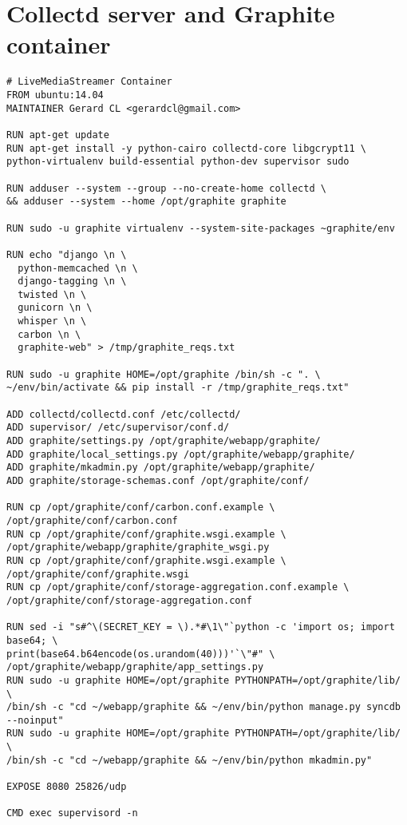 \section{Collectd server and Graphite container}\label{ANX:dockerFiles6}


\begin{verbatim}
# LiveMediaStreamer Container
FROM ubuntu:14.04
MAINTAINER Gerard CL <gerardcl@gmail.com>

RUN apt-get update
RUN apt-get install -y python-cairo collectd-core libgcrypt11 \
python-virtualenv build-essential python-dev supervisor sudo

RUN adduser --system --group --no-create-home collectd \
&& adduser --system --home /opt/graphite graphite

RUN sudo -u graphite virtualenv --system-site-packages ~graphite/env

RUN echo "django \n \
  python-memcached \n \
  django-tagging \n \
  twisted \n \
  gunicorn \n \
  whisper \n \
  carbon \n \
  graphite-web" > /tmp/graphite_reqs.txt

RUN sudo -u graphite HOME=/opt/graphite /bin/sh -c ". \
~/env/bin/activate && pip install -r /tmp/graphite_reqs.txt"

ADD collectd/collectd.conf /etc/collectd/
ADD supervisor/ /etc/supervisor/conf.d/
ADD graphite/settings.py /opt/graphite/webapp/graphite/
ADD graphite/local_settings.py /opt/graphite/webapp/graphite/
ADD graphite/mkadmin.py /opt/graphite/webapp/graphite/
ADD graphite/storage-schemas.conf /opt/graphite/conf/

RUN cp /opt/graphite/conf/carbon.conf.example \
/opt/graphite/conf/carbon.conf
RUN cp /opt/graphite/conf/graphite.wsgi.example \
/opt/graphite/webapp/graphite/graphite_wsgi.py
RUN cp /opt/graphite/conf/graphite.wsgi.example \
/opt/graphite/conf/graphite.wsgi
RUN cp /opt/graphite/conf/storage-aggregation.conf.example \
/opt/graphite/conf/storage-aggregation.conf

RUN sed -i "s#^\(SECRET_KEY = \).*#\1\"`python -c 'import os; import base64; \
print(base64.b64encode(os.urandom(40)))'`\"#" \
/opt/graphite/webapp/graphite/app_settings.py
RUN sudo -u graphite HOME=/opt/graphite PYTHONPATH=/opt/graphite/lib/ \
/bin/sh -c "cd ~/webapp/graphite && ~/env/bin/python manage.py syncdb --noinput"
RUN sudo -u graphite HOME=/opt/graphite PYTHONPATH=/opt/graphite/lib/ \
/bin/sh -c "cd ~/webapp/graphite && ~/env/bin/python mkadmin.py"

EXPOSE 8080 25826/udp

CMD exec supervisord -n
\end{verbatim}

